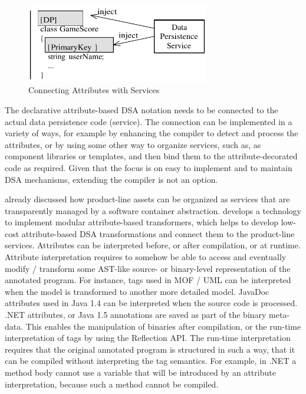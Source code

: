 \begin{figure}[ht]
	\begin{center}
		\includegraphics[width=8cm,height=!]{ch02/inject}
	\end{center}
	\caption{Connecting Attributes with Services}
	\label{fig:inject}
\end{figure}

The declarative attribute-based DSA notation needs to be connected to the actual data persistence code (service). The connection can be implemented in a variety of ways, for example by enhancing the compiler to detect and process the attributes, or by using some other way to organize services, such as, as component libraries or templates, and then bind them to the attribute-decorated code as required. Given that the focus is on easy to implement and to maintain DSA mechanisms, extending the compiler is not an option.

 already discussed how product-line assets can be organized as services that are transparently managed by a software container abstraction.  develops a technology to implement modular attribute-based transformers, which helps to develop low-cost attribute-based DSA transformations and connect them to the product-line services. Attributes can be interpreted before, or after compilation, or at runtime. Attribute interpretation requires to somehow be able to access and eventually modify / transform some AST-like source- or binary-level representation of the annotated program. For instance, tags used in MOF / UML can be interpreted when the model is transformed to another more detailed model. JavaDoc attributes used in Java 1.4 can be interpreted when the source code is processed. .NET attributes, or Java 1.5 annotations are saved as part of the binary meta-data. This enables the manipulation of binaries after compilation, or the run-time interpretation of tags by using the Reflection API. The run-time interpretation requires that the original annotated program is structured in such a way, that it can be compiled without interpreting the tag semantics. For example, in .NET a method body cannot use a variable that will be introduced by an attribute interpretation, because such a method cannot be compiled.

